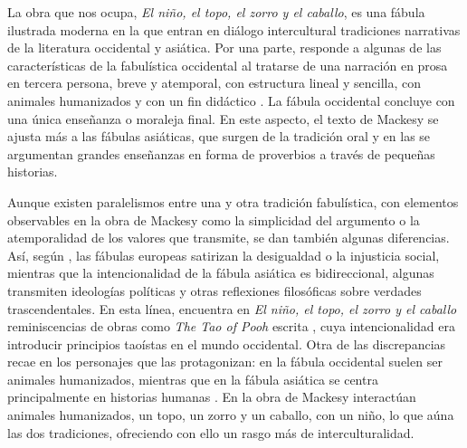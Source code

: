 \documentclass[spanish]{textolivre}
\begin{document}
La obra que nos ocupa, \textit{El niño, el topo, el zorro y el caballo}, es una fábula ilustrada moderna en la que entran en diálogo intercultural tradiciones narrativas de la literatura occidental y asiática. Por una parte, responde a algunas de las características de la fabulística occidental al tratarse de una narración en prosa en tercera persona, breve y atemporal, con estructura lineal y sencilla, con animales humanizados y con un fin didáctico \cite{estebanez_calderon_breve_2015}. La fábula occidental concluye con una única enseñanza o moraleja final. En este aspecto, el texto de Mackesy se ajusta más a las fábulas asiáticas, que surgen de la tradición oral y en las se argumentan grandes enseñanzas en forma de proverbios a través de pequeñas historias.

Aunque existen paralelismos entre una y otra tradición fabulística, con elementos observables en la obra de Mackesy como la simplicidad del argumento o la atemporalidad de los valores que transmite, se dan también algunas diferencias. Así, según \textcite{chen_reconstructing_2017}, las fábulas europeas satirizan la desigualdad o la injusticia social, mientras que la intencionalidad de la fábula asiática es bidireccional, algunas transmiten ideologías políticas y otras reflexiones filosóficas sobre verdades trascendentales.  En esta línea, \textcite{krug_how_2020} encuentra en \textit{El niño, el topo, el zorro y el caballo} reminiscencias de obras como \textit{The Tao of Pooh} escrita \textcite{hoff_tao_1982}, cuya intencionalidad era introducir principios taoístas en el mundo occidental. Otra de las discrepancias recae en los personajes que las protagonizan: en la fábula occidental suelen ser animales humanizados, mientras que en la fábula asiática se centra principalmente en historias humanas \cite{chen_reconstructing_2017}. En la obra de Mackesy interactúan animales humanizados, un topo, un zorro y un caballo, con un niño, lo que aúna las dos tradiciones, ofreciendo con ello un rasgo más de interculturalidad.
\end{document}
